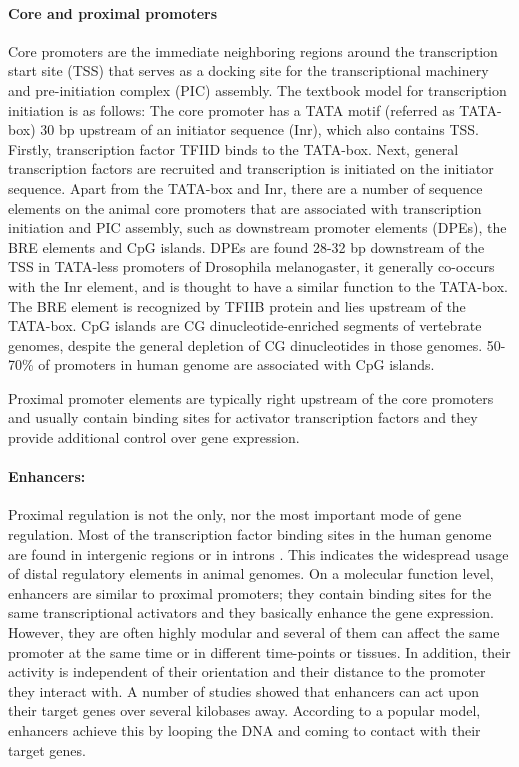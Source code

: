 \documentclass[12pt,]{krantz}
\let\oldparagraph\paragraph
\renewcommand{\paragraph}[1]{\oldparagraph{#1}\mbox{}}
\theoremstyle{definition}
\theoremstyle{definition}
\theoremstyle{definition}
\theoremstyle{remark}
\begin{document}
\hypertarget{core-and-proximal-promoters}{%
\paragraph{Core and proximal
promoters}\label{core-and-proximal-promoters}}

Core promoters are the immediate neighboring regions around the
transcription start site (TSS) that serves as a docking site for the
transcriptional machinery and pre-initiation complex (PIC) assembly. The
textbook model for transcription initiation is as follows: The core
promoter has a TATA motif (referred as TATA-box) 30 bp upstream of an
initiator sequence (Inr), which also contains TSS. Firstly,
transcription factor TFIID binds to the TATA-box. Next, general
transcription factors are recruited and transcription is initiated on
the initiator sequence. Apart from the TATA-box and Inr, there are a
number of sequence elements on the animal core promoters that are
associated with transcription initiation and PIC assembly, such as
downstream promoter elements (DPEs), the BRE elements and CpG islands.
DPEs are found 28-32 bp downstream of the TSS in TATA-less promoters of
Drosophila melanogaster, it generally co-occurs with the Inr element,
and is thought to have a similar function to the TATA-box. The BRE
element is recognized by TFIIB protein and lies upstream of the
TATA-box. CpG islands are CG dinucleotide-enriched segments of
vertebrate genomes, despite the general depletion of CG dinucleotides in
those genomes. 50-70\% of promoters in human genome are associated with
CpG islands.

Proximal promoter elements are typically right upstream of the core
promoters and usually contain binding sites for activator transcription
factors and they provide additional control over gene expression.

\hypertarget{enhancers}{%
\paragraph{Enhancers:}\label{enhancers}}

Proximal regulation is not the only, nor the most important mode of gene
regulation. Most of the transcription factor binding sites in the human
genome are found in intergenic regions or in introns . This indicates
the widespread usage of distal regulatory elements in animal genomes. On
a molecular function level, enhancers are similar to proximal promoters;
they contain binding sites for the same transcriptional activators and
they basically enhance the gene expression. However, they are often
highly modular and several of them can affect the same promoter at the
same time or in different time-points or tissues. In addition, their
activity is independent of their orientation and their distance to the
promoter they interact with. A number of studies showed that enhancers
can act upon their target genes over several kilobases away. According
to a popular model, enhancers achieve this by looping the DNA and coming
to contact with their target genes.
\end{document}
